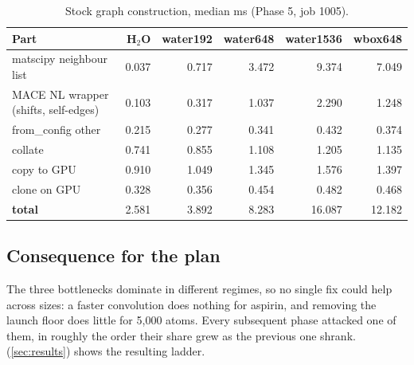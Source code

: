 \begin{table}[h]
\centering
\caption{Stock graph construction, median ms (Phase 5, job 1005).}
\label{tab:graphbuild}
\small
\begin{tabular}{lrrrrr}
\toprule
Part & H$_2$O & water192 & water648 & water1536 & wbox648 \\
\midrule
matscipy neighbour list & 0.037 & 0.717 & 3.472 & 9.374 & 7.049 \\
MACE NL wrapper (shifts, self-edges) & 0.103 & 0.317 & 1.037 & 2.290 & 1.248 \\
from\_config other & 0.215 & 0.277 & 0.341 & 0.432 & 0.374 \\
collate & 0.741 & 0.855 & 1.108 & 1.205 & 1.135 \\
copy to GPU & 0.910 & 1.049 & 1.345 & 1.576 & 1.397 \\
clone on GPU & 0.328 & 0.356 & 0.454 & 0.482 & 0.468 \\
\midrule
\textbf{total} & 2.581 & 3.892 & 8.283 & 16.087 & 12.182 \\
\bottomrule
\end{tabular}
\end{table}

\subsection{Consequence for the plan}
The three bottlenecks dominate in different regimes, so no single fix could help across sizes: a faster convolution does nothing for aspirin, and removing the launch floor does little for 5{,}000 atoms. Every subsequent phase attacked one of them, in roughly the order their share grew as the previous one shrank.  (\cref{sec:results}) shows the resulting ladder.
